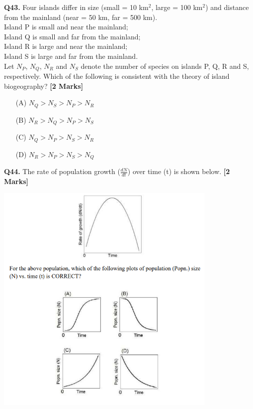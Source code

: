 \documentclass[11pt]{article}
\newcommand{\questionb}[2]{
    \noindent\textbf{Q#2.} #1 \hfill \textbf{[2 Marks]}
}
\begin{document}
\questionb{Four islands differ in size (small = 10 km\(^2\), large = 100 km\(^2\)) and distance from the mainland (near = 50 km, far = 500 km).\\
Island P is small and near the mainland;\\
Island Q is small and far from the mainland;\\
Island R is large and near the mainland;\\
Island S is large and far from the mainland.\\
Let \(N_P\), \(N_Q\), \(N_R\) and \(N_S\) denote the number of species on islands P, Q, R and S, respectively. Which of the following is consistent with the theory of island biogeography?}{43}
\begin{enumerate}
    \item[(A)] \(N_Q > N_S > N_P > N_R\)
    \item[(B)] \(N_R > N_Q > N_P > N_S\)
    \item[(C)] \(N_Q > N_P > N_S > N_R\)
    \item[(D)] \(N_R > N_P > N_S > N_Q\)
\end{enumerate}
\vspace{0.5cm}

\questionb{The rate of population growth (\( \frac{dN}{dt} \)) over time (t) is shown below.}{44}
\begin{center}
\includegraphics[width=0.8\textwidth]{figures/44}
\end{center}
\vspace{0.5cm}
\end{document}

